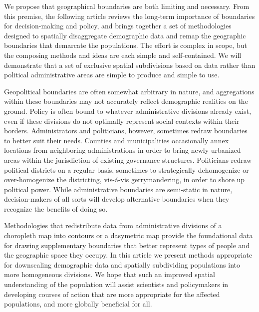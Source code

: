 \documentclass[draft]{article}
\begin{document}
We propose that geographical boundaries are both limiting and necessary.  From this premise, the following article reviews the long-term importance of boundaries for decision-making and policy, and brings together a set of methodologies designed to spatially disaggregate demographic data and remap the geographic boundaries that demarcate the populations.  The effort is complex in scope, but the composing methods and ideas are each simple and self-contained.  We will demonstrate that a set of exclusive spatial subdivisions based on data rather than political administrative areas are simple to produce and simple to use.

Geopolitical boundaries are often somewhat arbitrary in nature, and aggregations within these boundaries may not accurately reflect demographic realities on the ground.  Policy is often bound to whatever administrative divisions already exist, even if these divisions do not optimally represent social contexts within their borders.  Administrators and politicians, however, sometimes redraw boundaries to better suit their needs.  Counties and municipalities occasionally annex locations from neighboring administrations in order to bring newly urbanized areas within the jurisdiction of existing governance structures.  Politicians redraw political districts on a regular basis, sometimes to strategically dehomogenize or over-homogenize the districting, vis-\'{a}-vis gerrymandering, in order to shore up political power.  While administrative boundaries are semi-static in nature, decision-makers of all sorts will develop alternative boundaries when they recognize the benefits of doing so.

Methodologies that redistribute data from administrative divisions of a choropleth map into contours or a dasymetric map provide the foundational data for drawing supplementary boundaries that better represent types of people and the geographic space they occupy.  In this article we present methods appropriate 
for downscaling demographic data and spatially subdividing populations into more homogeneous divisions.  We hope that such an improved spatial understanding of the population will assist scientists and policymakers in developing courses of action that are more appropriate for the affected populations, and more globally beneficial for all.  %
\end{document}

